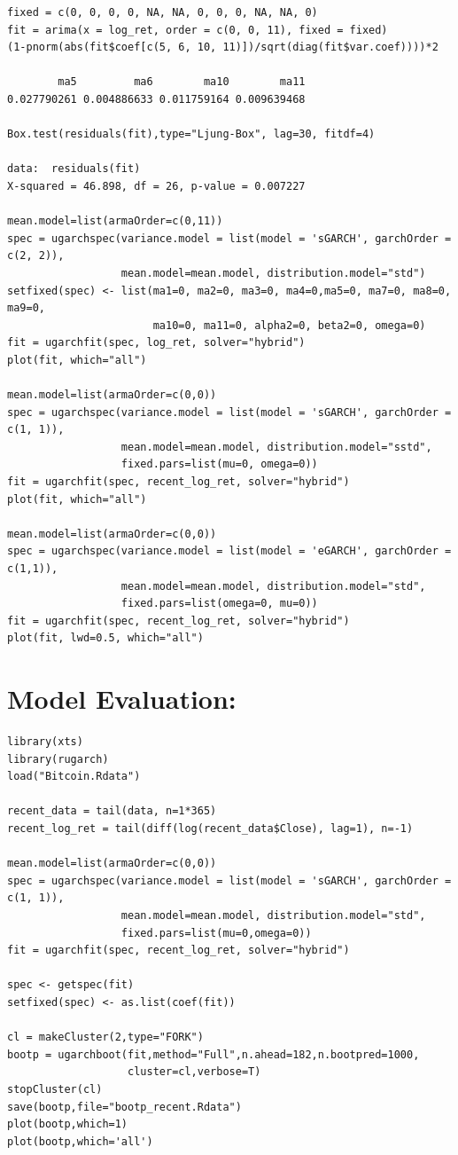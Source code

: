 \documentclass[12pt]{article}
\begin{document}
{\begin{verbatim}
fixed = c(0, 0, 0, 0, NA, NA, 0, 0, 0, NA, NA, 0)
fit = arima(x = log_ret, order = c(0, 0, 11), fixed = fixed)
(1-pnorm(abs(fit$coef[c(5, 6, 10, 11)])/sqrt(diag(fit$var.coef))))*2

        ma5         ma6        ma10        ma11 
0.027790261 0.004886633 0.011759164 0.009639468 

Box.test(residuals(fit),type="Ljung-Box", lag=30, fitdf=4)

data:  residuals(fit)
X-squared = 46.898, df = 26, p-value = 0.007227

mean.model=list(armaOrder=c(0,11))
spec = ugarchspec(variance.model = list(model = 'sGARCH', garchOrder = c(2, 2)),
                  mean.model=mean.model, distribution.model="std")
setfixed(spec) <- list(ma1=0, ma2=0, ma3=0, ma4=0,ma5=0, ma7=0, ma8=0, ma9=0,
                       ma10=0, ma11=0, alpha2=0, beta2=0, omega=0)
fit = ugarchfit(spec, log_ret, solver="hybrid")
plot(fit, which="all")

mean.model=list(armaOrder=c(0,0))
spec = ugarchspec(variance.model = list(model = 'sGARCH', garchOrder = c(1, 1)), 
                  mean.model=mean.model, distribution.model="sstd", 
                  fixed.pars=list(mu=0, omega=0))
fit = ugarchfit(spec, recent_log_ret, solver="hybrid")
plot(fit, which="all")

mean.model=list(armaOrder=c(0,0))
spec = ugarchspec(variance.model = list(model = 'eGARCH', garchOrder = c(1,1)), 
                  mean.model=mean.model, distribution.model="std", 
                  fixed.pars=list(omega=0, mu=0))
fit = ugarchfit(spec, recent_log_ret, solver="hybrid")
plot(fit, lwd=0.5, which="all")
\end{verbatim}}

\section{Model Evaluation:}

{\footnotesize
\begin{verbatim}
library(xts)
library(rugarch)
load("Bitcoin.Rdata")

recent_data = tail(data, n=1*365)
recent_log_ret = tail(diff(log(recent_data$Close), lag=1), n=-1)

mean.model=list(armaOrder=c(0,0))
spec = ugarchspec(variance.model = list(model = 'sGARCH', garchOrder = c(1, 1)),
                  mean.model=mean.model, distribution.model="std",
                  fixed.pars=list(mu=0,omega=0))
fit = ugarchfit(spec, recent_log_ret, solver="hybrid")

spec <- getspec(fit)
setfixed(spec) <- as.list(coef(fit))

cl = makeCluster(2,type="FORK")
bootp = ugarchboot(fit,method="Full",n.ahead=182,n.bootpred=1000,
                   cluster=cl,verbose=T)
stopCluster(cl)
save(bootp,file="bootp_recent.Rdata")
plot(bootp,which=1)
plot(bootp,which='all')
\end{verbatim}
}
\end{document}
